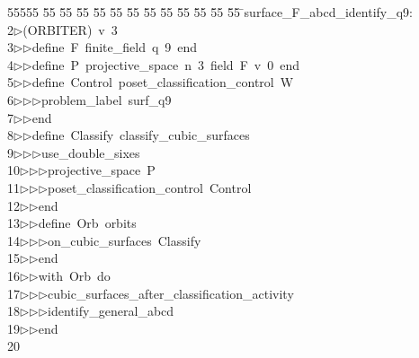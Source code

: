 %
%
\begin{tabbing}
55555 \= 55 \= 55 \= 55 \= 55 \= 55 \= 55 \= 55 \= 55 \= 55 \= 55 \= 55 \= 55 \= \>surface\_F\_abcd\_identify\_q9:\\[0pt]
2\>$\triangleright$\>(ORBITER)\ v\ 3\ \\[0pt]
3\>$\triangleright$\>$\triangleright$\>define\ F\ finite\_field\ q\ 9\ end\ \\[0pt]
4\>$\triangleright$\>$\triangleright$\>define\ P\ projective\_space\ n\ 3\ field\ F\ v\ 0\ end\ \\[0pt]
5\>$\triangleright$\>$\triangleright$\>define\ Control\ poset\_classification\_control\ W\ \\[0pt]
6\>$\triangleright$\>$\triangleright$\>$\triangleright$\>problem\_label\ surf\_q9\ \\[0pt]
7\>$\triangleright$\>$\triangleright$\>end\ \\[0pt]
8\>$\triangleright$\>$\triangleright$\>define\ Classify\ classify\_cubic\_surfaces\ \\[0pt]
9\>$\triangleright$\>$\triangleright$\>$\triangleright$\>use\_double\_sixes\ \\[0pt]
10\>$\triangleright$\>$\triangleright$\>$\triangleright$\>projective\_space\ P\ \\[0pt]
11\>$\triangleright$\>$\triangleright$\>$\triangleright$\>poset\_classification\_control\ Control\ \\[0pt]
12\>$\triangleright$\>$\triangleright$\>end\ \\[0pt]
13\>$\triangleright$\>$\triangleright$\>define\ Orb\ orbits\ \\[0pt]
14\>$\triangleright$\>$\triangleright$\>$\triangleright$\>on\_cubic\_surfaces\ Classify\ \\[0pt]
15\>$\triangleright$\>$\triangleright$\>end\ \\[0pt]
16\>$\triangleright$\>$\triangleright$\>with\ Orb\ do\ \\[0pt]
17\>$\triangleright$\>$\triangleright$\>$\triangleright$\>cubic\_surfaces\_after\_classification\_activity\ \\[0pt]
18\>$\triangleright$\>$\triangleright$\>$\triangleright$\>identify\_general\_abcd\ \\[0pt]
19\>$\triangleright$\>$\triangleright$\>end\\[0pt]
20\>\end{tabbing}
